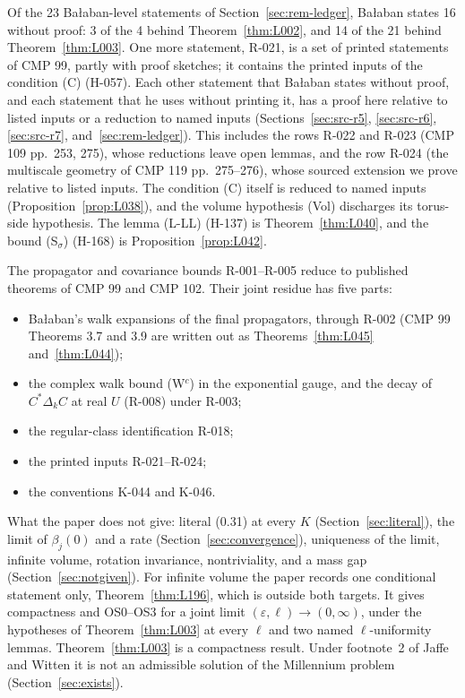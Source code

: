 Of the 23 Ba{\l}aban-level statements of Section~\ref{sec:rem-ledger}, Ba{\l}aban states 16 without proof: 3 of the 4 behind Theorem~\ref{thm:L002}, and 14 of the 21 behind Theorem~\ref{thm:L003}. One more statement, R-021, is a set of printed statements of CMP 99, partly with proof sketches; it contains the printed inputs of the condition (C) (H-057). Each other statement that Ba{\l}aban states without proof, and each statement that he uses without printing it, has a proof here relative to listed inputs or a reduction to named inputs (Sections~\ref{sec:src-r5}, \ref{sec:src-r6}, \ref{sec:src-r7}, and~\ref{sec:rem-ledger}). This includes the rows R-022 and R-023 (CMP 109 pp.~253, 275), whose reductions leave open lemmas, and the row R-024 (the multiscale geometry of CMP 119 pp.~275--276), whose sourced extension we prove relative to listed inputs. The condition (C) itself is reduced to named inputs (Proposition~\ref{prop:L038}), and the volume hypothesis (Vol) discharges its torus-side hypothesis. The lemma (L-LL) (H-137) is Theorem~\ref{thm:L040}, and the bound (S$_\sigma$) (H-168) is Proposition~\ref{prop:L042}.

The propagator and covariance bounds R-001--R-005 reduce to published theorems of CMP 99 and CMP 102. Their joint residue has five parts:
\begin{itemize}
\item Ba{\l}aban's walk expansions of the final propagators, through R-002 (CMP 99 Theorems 3.7 and 3.9 are written out as Theorems~\ref{thm:L045} and~\ref{thm:L044});
\item the complex walk bound (W$^c$) in the exponential gauge, and the decay of $C^*\Delta_kC$ at real $U$ (R-008) under R-003;
\item the regular-class identification R-018;
\item the printed inputs R-021--R-024;
\item the conventions K-044 and K-046.
\end{itemize}

What the paper does not give: literal (0.31) at every $K$ (Section~\ref{sec:literal}), the limit of $\beta_j(0)$ and a rate (Section~\ref{sec:convergence}), uniqueness of the limit, infinite volume, rotation invariance, nontriviality, and a mass gap (Section~\ref{sec:notgiven}). For infinite volume the paper records one conditional statement only, Theorem~\ref{thm:L196}, which is outside both targets. It gives compactness and OS0--OS3 for a joint limit $(\varepsilon,\ell)\to(0,\infty)$, under the hypotheses of Theorem~\ref{thm:L003} at every $\ell$ and two named $\ell$-uniformity lemmas. Theorem~\ref{thm:L003} is a compactness result. Under footnote~2 of Jaffe and Witten \cite{jaffewitten} it is not an admissible solution of the Millennium problem (Section~\ref{sec:exists}).

